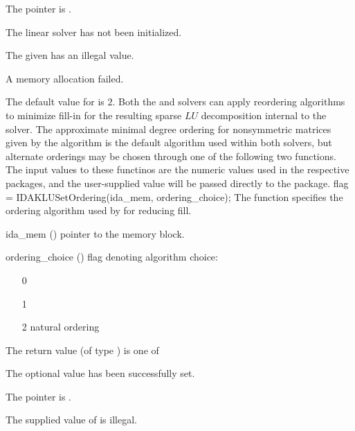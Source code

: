 {{\begin{args}
    The  pointer is .
  \item[\Id{IDASLS\_LMEM\_NULL}]
    The {\idaklu} linear solver has not been initialized.
  \item[\Id{IDASLS\_ILL\_INPUT}]
    The given  has an illegal value.
  \item[\Id{IDASLS\_MEM\_FAIL}]
    A memory allocation failed.
  \end{args}
}
{
  The default value for  is $2$.
}
Both the {\idaklu} and {\idasuperlumt} solvers can apply reordering
algorithms to minimize fill-in for the resulting sparse $LU$
decomposition internal to the solver.  The approximate minimal degree
ordering for nonsymmetric matrices given by the  algorithm
is the default algorithm used within both solvers, but alternate
orderings may be chosen through one of the following two functions.
The input values to these functinos are the numeric values used in the respective
packages, and the user-supplied value will be passed directly to the package.
{
  flag = IDAKLUSetOrdering(ida\_mem, ordering\_choice);
}
{
  The function  specifies the ordering algorithm
  used by {\idaklu} for reducing fill.
}
{
  \begin{args}
  \item[ida\_mem] ()
    pointer to the {\idas} memory block.
  \item[ordering\_choice] ()
    flag denoting algorithm choice:
    \begin{itemize}
    \item[0] 
    \item[1] 
    \item[2] natural ordering
    \end{itemize}
  \end{args}
}
{
  The return value  (of type ) is one of
  \begin{args}
  \item[\Id{IDASLS\_SUCCESS}] 
    The optional value has been successfully set.
  \item[\Id{IDASLS\_MEM\_NULL}]
    The  pointer is .
  \item[\Id{IDASLS\_ILL\_INPUT}]
    The supplied value of  is illegal.

\end{args}}}
